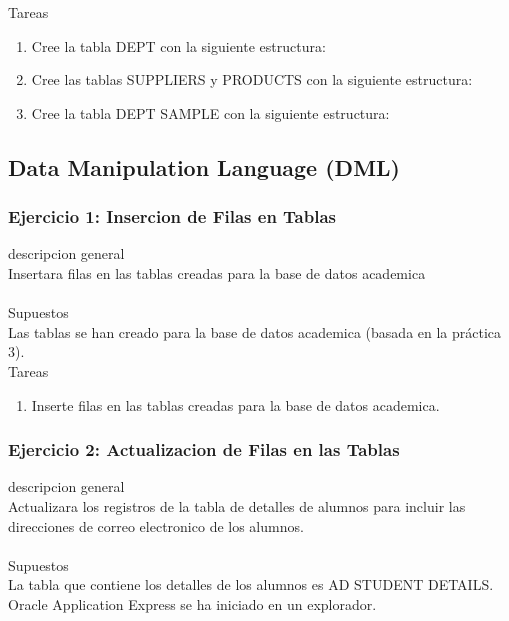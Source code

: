 \documentclass[12pt,letterpaper]{article}
\begin{document}
Tareas\\
\begin{enumerate}[1.]
    \item  Cree la tabla DEPT con la siguiente estructura:  
     
    \item Cree las tablas SUPPLIERS y PRODUCTS con la siguiente estructura:
    
    \item Cree la tabla DEPT SAMPLE con la siguiente estructura:
    
   
    
		\end{enumerate} 
		




\newpage
\subsection{Data Manipulation Language (DML)} 

		\subsubsection{Ejercicio 1: Insercion de Filas en Tablas} 
descripcion general  \\
Insertara filas en las tablas creadas para la base de datos academica\\
 \\
Supuestos\\
Las tablas se han creado para la base de datos academica (basada en la práctica 3).\\


Tareas\\
\begin{enumerate}[1.]
    \item Inserte filas en las tablas creadas para la base de datos academica.  
     
    
    
		\end{enumerate} 
		
		\subsubsection{Ejercicio 2: Actualizacion de Filas en las Tablas} 
descripcion general  \\
Actualizara los registros de la tabla de detalles de alumnos para incluir las direcciones de correo electronico de los alumnos.\\
 \\
Supuestos\\
La tabla que contiene los detalles de los alumnos es AD STUDENT DETAILS.\\
Oracle Application Express se ha iniciado en un explorador.\\
\end{document}
